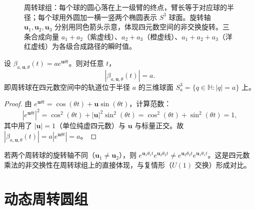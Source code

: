\begin{figure}[htbp]
\caption{周转球组：每个球的圆心落在上一级臂的终点，臂长等于对应球的半径；每个球用外圆加一横一竖两个椭圆表示 $S^3$ 球面。旋转轴 $\mathbf u_1,\mathbf u_2,\mathbf u_3$ 分别用同色箭头示意，体现四元数空间的非交换旋转。三条合成向量 $a_1+a_2$（紫虚线）、$a_2+a_3$（橙虚线）、$a_1+a_2+a_3$（洋红虚线）为各级合成路径的瞬时值。}
\label{fig:dyn_epicycle_ball_group}
\end{figure}

\begin{proposition}[周转球的范数]\label{prop:dyn_epicycle_ball_norm}
设 $\beta_{a,\mathbf u,\theta}(t)=a e^{\mathbf u\theta t}$。则对任意 $t$，
\[
|\beta_{a,\mathbf u,\theta}(t)|=a.
\]
即周转球在四元数空间中的轨道位于半径 $a$ 的三维球面 $S^3_a=\{q\in\mathbb H:|q|=a\}$ 上。
\end{proposition}

\begin{proof}
由 $e^{\mathbf u\theta t}=\cos(\theta t)+\mathbf u\sin(\theta t)$，计算范数：
\[
|e^{\mathbf u\theta t}|^2=\cos^2(\theta t)+|\mathbf u|^2\sin^2(\theta t)=\cos^2(\theta t)+\sin^2(\theta t)=1,
\]
其中用了 $|\mathbf u|=1$（单位纯虚四元数）与 $\mathbf u$ 与标量正交。故 $|\beta_{a,\mathbf u,\theta}(t)|=a|e^{\mathbf u\theta t}|=a$。
\end{proof}

\begin{remark}[周转球与四元数乘法的非交换性]\label{rem:dyn_epicycle_ball_noncommutative}
若两个周转球的旋转轴不同（$\mathbf u_1\neq\mathbf u_2$），则 $e^{\mathbf u_1\theta_1 t}e^{\mathbf u_2\theta_2 t}\neq e^{\mathbf u_2\theta_2 t}e^{\mathbf u_1\theta_1 t}$。这是四元数乘法的非交换性在周转球组上的直接体现，与复情形（$U(1)$ 交换）形成对比。
\end{remark}

\section{动态周转圆组}
\label{sec:dyn_single}


